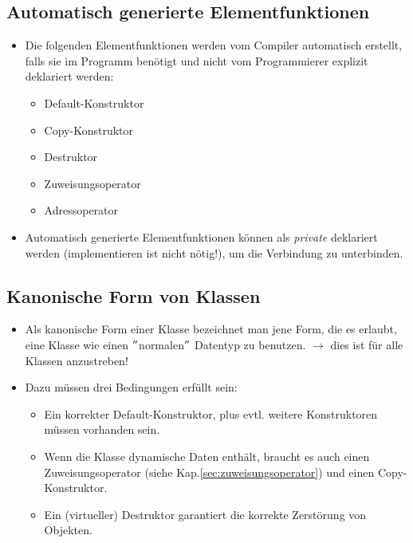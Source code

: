 \subsection{Automatisch generierte Elementfunktionen}
\begin{itemize}
	\item Die folgenden Elementfunktionen werden vom Compiler automatisch erstellt, falls sie im Programm benötigt und nicht vom Programmierer explizit deklariert werden:
	\begin{itemize}
		\item Default-Konstruktor
		\item Copy-Konstruktor
		\item Destruktor
		\item Zuweisungsoperator
		\item Adressoperator
	\end{itemize}
	\item Automatisch generierte Elementfunktionen können als \emph{private} deklariert werden (implementieren ist nicht nötig!), um die Verbindung zu unterbinden.
\end{itemize}

\subsection{Kanonische Form von Klassen}
\begin{itemize}
	\item Als kanonische Form einer Klasse bezeichnet man jene Form, die es erlaubt, eine Klasse wie einen $"$normalen$"$ Datentyp zu benutzen. $\rightarrow$ dies ist für alle Klassen anzustreben!
	\item Dazu müssen drei Bedingungen erfüllt sein:
	\begin{itemize}
		\item Ein korrekter Default-Konstruktor, plus evtl. weitere Konstruktoren müssen vorhanden sein.
		\item Wenn die Klasse dynamische Daten enthält, braucht es auch einen Zuweisungsoperator (siehe Kap.\ref{sec:zuweisungsoperator}) und einen Copy-Konstruktor.
		\item Ein (virtueller) Destruktor garantiert die korrekte Zerstörung von Objekten.
	\end{itemize}
\end{itemize}

